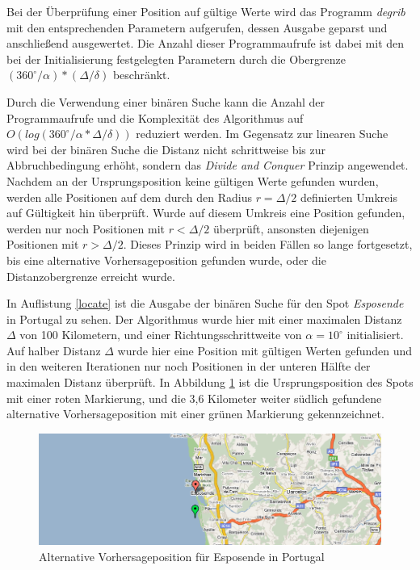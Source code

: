 Bei der Überprüfung einer Position auf gültige Werte wird das Programm
\textit{degrib} mit den entsprechenden Parametern aufgerufen, dessen
Ausgabe geparst und anschließend ausgewertet. Die Anzahl dieser
Programmaufrufe ist dabei mit den bei der Initialisierung festgelegten
Parametern durch die Obergrenze $(360^{\circ} / \alpha) * (\Delta /
\delta)$ beschränkt.

Durch die Verwendung einer binären Suche kann die Anzahl der
Programmaufrufe und die Komplexität des Algorithmus auf
$O(log(360^{\circ} / \alpha * \Delta / \delta))$ reduziert werden. Im
Gegensatz zur linearen Suche wird bei der binären Suche die Distanz
nicht schrittweise bis zur Abbruchbedingung erhöht, sondern das
\textit{Divide and Conquer} Prinzip angewendet. Nachdem an der
Ursprungsposition keine gültigen Werte gefunden wurden, werden alle
Positionen auf dem durch den Radius $r = \Delta / 2$ definierten
Umkreis auf Gültigkeit hin überprüft. Wurde auf diesem Umkreis eine
Position gefunden, werden nur noch Positionen mit $r < \Delta / 2$
überprüft, ansonsten diejenigen Positionen mit $r > \Delta /
2$. Dieses Prinzip wird in beiden Fällen so lange fortgesetzt, bis
eine alternative Vorhersageposition gefunden wurde, oder die
Distanzobergrenze erreicht wurde.



In Auflistung \ref{locate} ist die Ausgabe der binären Suche für den
Spot \textit{Esposende} in Portugal zu sehen. Der Algorithmus wurde
hier mit einer maximalen Distanz $\Delta$ von 100 Kilometern, und
einer Richtungsschrittweite von $\alpha = 10^{\circ}$
initialisiert. Auf halber Distanz $\Delta$ wurde hier eine Position
mit gültigen Werten gefunden und in den weiteren Iterationen nur noch
Positionen in der unteren Hälfte der maximalen Distanz überprüft. In
Abbildung \ref{locate-esposende} ist die Ursprungsposition des Spots
mit einer roten Markierung, und die 3,6 Kilometer weiter südlich
gefundene alternative Vorhersageposition mit einer grünen Markierung
gekennzeichnet.

\begin{figure}[h]
  \begin{center}
    \includegraphics[width=\textwidth]{bilder/locate-esposende}
    \caption{Alternative Vorhersageposition für Esposende in Portugal}
    \label{locate-esposende}
  \end{center}
\end{figure}

